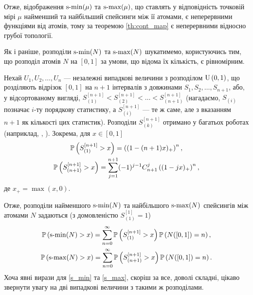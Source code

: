 Отже, відображення $\operatorname{s-min}(\mu)$ та $\operatorname{s-max}(\mu)$,
що ставлять у відповідність точковій мірі $\mu$ найменший та найбільший
спейсинги між її атомами, є неперервними функціями
від атомів, тому за теоремою \ref{th:cont_map} є 
неперервними відносно грубої топології.

Як і раніше, розподіли $\operatorname{s-min}(N)$ та $\operatorname{s-max}(N)$
шукатимемо, користуючись тим, що розподіл атомів $N$ на $[0, 1]$
за умови, що відома їх кількість, є рівномірним.

Нехай $U_1, U_2, \dots, U_{n}$ ---
незалежні випадкові величини
з розподілом $\mathrm{U}\left(0, 1\right)$, що розділяють відрізок $[0, 1]$ на $n+1$
інтервалів з довжинами $S_1, S_2, \dots, S_{n+1}$, або, у відсортованому вигляді, 
$S_{(1)}^{[n+1]} < S_{(2)}^{[n+1]} < \dots < S_{(n+1)}^{[n+1]}$
(нагадаємо, $S_{(i)}$ позначає $i$-ту порядкову статистику, а
$S_{(i)}^{[n+1]}$ --- те ж саме, але з вказанням $n+1$ як кількості цих статистик).
Розподіли $S_{(k)}^{[n+1]}$ отримано у багатьох роботах
(наприклад, \cite{Holst_1980}, \cite{Pinelis_2019}). Зокрема, для $x\in[0,1]$
\begin{gather}
    \label{min_spacing}
    \P{S_{(1)}^{[n+1]} > x} = \left((1-(n+1)x)_+\right)^n, \\
    \label{max_spacing}
    \P{S_{(n+1)}^{[n+1]} > x} = 
    \sum_{j=1}^{n+1} (-1)^{j-1} C_{n+1}^j \left((1-jx)_+\right)^n,
\end{gather}
де $x_+ = \max(x, 0)$.

Отже, розподіли найменшого $\operatorname{s-min}(N)$ та найбільшого $\operatorname{s-max}(N)$ спейсингів 
між атомами $N$ задаються
(з домовленістю $S_{(1)}^{[1]} = 1$)
\begin{gather}
    \label{s_min}
    \P{\smin(N) > x} = 
    \sum_{n=0}^{\infty} \P{S_{(1)}^{[n+1]} > x} \P{N([0, 1]) = n}, \\
    \label{s_max}
    \P{\smax(N) > x} = 
    \sum_{n=0}^{\infty} \P{S_{(n+1)}^{[n+1]} > x} \P{N([0, 1]) = n}.
\end{gather}
Хоча явні вирази для \eqref{s_min} та \eqref{s_max},
скоріш за все, доволі складні, цікаво звернути увагу на дві випадкові величини
з такими ж розподілами.

